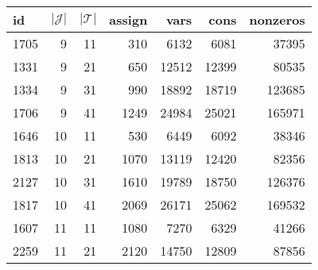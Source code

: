 \begin{tabular}{lrrrrrr}
\toprule
   id &  $|\mathcal{J}|$ &  $|\mathcal{T}|$ &  assign &  vars &  cons &  nonzeros \\
\midrule
 1705 &                9 &               11 &     310 &  6132 &  6081 &     37395 \\
 1331 &                9 &               21 &     650 & 12512 & 12399 &     80535 \\
 1334 &                9 &               31 &     990 & 18892 & 18719 &    123685 \\
 1706 &                9 &               41 &    1249 & 24984 & 25021 &    165971 \\
 1646 &               10 &               11 &     530 &  6449 &  6092 &     38346 \\
 1813 &               10 &               21 &    1070 & 13119 & 12420 &     82356 \\
 2127 &               10 &               31 &    1610 & 19789 & 18750 &    126376 \\
 1817 &               10 &               41 &    2069 & 26171 & 25062 &    169532 \\
 1607 &               11 &               11 &    1080 &  7270 &  6329 &     41266 \\
 2259 &               11 &               21 &    2120 & 14750 & 12809 &     87856 \\
\bottomrule
\end{tabular}
